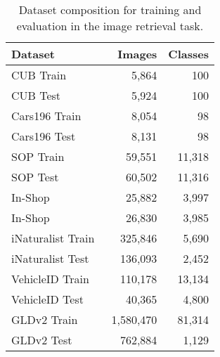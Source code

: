 \documentclass{article} \usepackage{iclr2023_conference,times}
\begin{document}
\begin{table}
	\caption{Dataset composition for training and evaluation in the image retrieval task.}
	\label{tab:datasets}
	\begin{center}
		\begin{tabular}{lrr}
			\toprule
			\textbf{Dataset}                              & \textbf{Images} & \textbf{Classes} \\
			\midrule
			CUB Train~\citep{wbm+10}                      & 5,864           & 100              \\
			CUB Test ~\citep{wbm+10}                      & 5,924           & 100              \\
			Cars196 Train~\citep{ksd+13}                  & 8,054           & 98               \\
			Cars196 Test~\citep{ksd+13}                   & 8,131           & 98               \\
			SOP Train~\citep{oh2016deep}                  & 59,551          & 11,318           \\
			SOP Test~\citep{oh2016deep}                   & 60,502          & 11,316           \\
			In-Shop~\citep{liu2016deepfashion}            & 25,882          & 3,997            \\
			In-Shop~\citep{liu2016deepfashion}            & 26,830          & 3,985            \\
			iNaturalist Train~\citep{van2018inaturalist}  & 325,846         & 5,690            \\
			iNaturalist Test~\citep{van2018inaturalist}   & 136,093         & 2,452            \\
			VehicleID Train~\citep{liuhongye2016vehicles} & 110,178         & 13,134           \\
			VehicleID Test~\citep{liuhongye2016vehicles}  & 40,365          & 4,800            \\
			GLDv2 Train~\citep{weyand2020google}          & 1,580,470       & 81,314           \\
			GLDv2 Test ~\citep{weyand2020google}          & 762,884         & 1,129            \\
			\bottomrule
		\end{tabular}
	\end{center}
\end{table}
\end{document}
